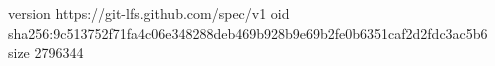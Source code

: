 version https://git-lfs.github.com/spec/v1
oid sha256:9c513752f71fa4c06e348288deb469b928b9e69b2fe0b6351caf2d2fdc3ac5b6
size 2796344
